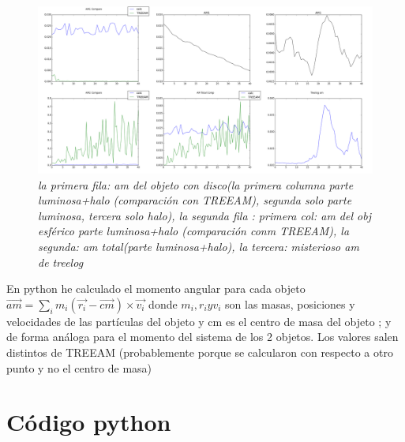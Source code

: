 \documentclass[12pt]{article} %
\renewcommand{\=}[1]{\stackrel{#1}{=}} %
\theoremstyle{definition}
\theoremstyle{remark}
\begin{document}
\begin{figure}[!ht]
 \centering
 \includegraphics[scale=0.2]{sep5AM.png}
 \caption{\emph{la primera fila: am del objeto con disco(la primera columna parte luminosa+halo (comparación con TREEAM), 
segunda solo parte luminosa, tercera solo halo), la segunda fila : primera col: am del obj esférico parte luminosa+halo
(comparación conm TREEAM),  la segunda: am total(parte luminosa+halo), la tercera:  misterioso am de treelog }}
\end{figure}

En python he calculado el momento angular para cada objeto $\vec{am} = \sum_i{m_i (\vec{r_i} - \vec{cm})\times \vec{v_i}} $
donde $m_i, r_i y v_i$ son las masas, posiciones y velocidades de las partículas del objeto y cm es el centro de masa del objeto
; y de forma análoga para el momento del sistema de los 2 objetos. Los valores salen distintos de TREEAM (probablemente porque se calcularon con respecto a otro punto y no el centro de masa)

\clearpage
\newpage

\section*{Código python}
\end{document}
